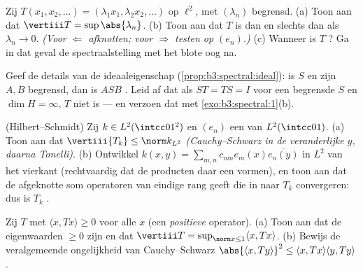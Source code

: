 \begin{exercise}[$\star$]\label{exo:b3:spectral:2}
Zij $T(x_1, x_2, \dots) = (\lambda_1x_1, \lambda_2x_2, \dots)$ op
$\ell^2$, met $(\lambda_n)$ begrensd.
(a) Toon aan dat $\vertiii T = \sup\abs{\lambda_n}$.
(b) Toon aan dat $T$  is dan en slechts dan als $\lambda_n
\to 0$. \emph{(Voor $\Leftarrow$ afknotten; voor $\Rightarrow$
testen op $(e_n)$.)}
(c) Wanneer is $T$ ? Ga in dat geval de
spectraalstelling met het blote oog na.
\end{exercise}

\begin{exercise}[$\star\star$]\label{exo:b3:spectral:3}
Geef de details van de ideaaleigenschap
(\cref{prop:b3:spectral:ideal}): is $S$  en zijn $A, B$
begrensd, dan is $ASB$ . Leid af dat als $ST = TS = I$
voor een begrensde $S$ en $\dim H = \infty$, $T$ niet  is
--- en verzoen dat met \cref{exo:b3:spectral:1}(b).
\end{exercise}

\begin{exercise}[$\star\star$]\label{exo:b3:spectral:4}
(Hilbert--Schmidt) Zij $k \in L^2(\intcc01^2)$ en $(e_n)$ een
 van $L^2(\intcc01)$.
(a) Toon aan dat $\vertiii{T_k} \leq \norm k_{L^2}$
\emph{(Cauchy--Schwarz in de veranderlijke $y$, daarna
Tonelli)}.
(b) Ontwikkel $k(x,y) = \sum_{m,n}c_{mn}e_m(x)\overline{e_n(y)}$
in $L^2$ van het vierkant (rechtvaardig dat de producten daar een
 vormen), en toon aan dat de afgeknotte som
operatoren van eindige rang geeft die in  naar $T_k$
convergeren: dus is $T_k$ .
\end{exercise}

\begin{exercise}[$\star\star$]\label{exo:b3:spectral:5}
Zij $T$  met $\langle x, Tx\rangle \geq 0$ voor alle
$x$ (een \emph{positieve} operator).
(a) Toon aan dat de eigenwaarden $\geq 0$ zijn en dat $\vertiii T
= \sup_{\norm x\leq1}\langle x, Tx\rangle$.
(b) Bewijs de veralgemeende ongelijkheid van Cauchy--Schwarz
$\abs{\langle x, Ty\rangle}^2 \leq \langle x, Tx\rangle\langle y,
Ty\rangle$.
\end{exercise}

